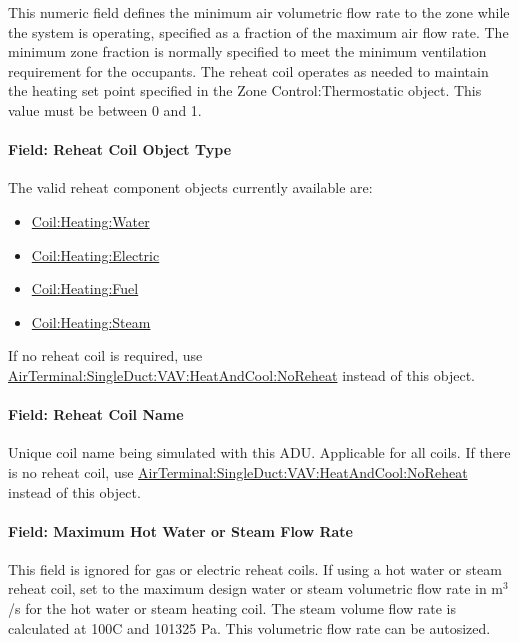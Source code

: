 This numeric field defines the minimum air volumetric flow rate to the zone while the system is operating, specified as a fraction of the maximum air flow rate. The minimum zone fraction is normally specified to meet the minimum ventilation requirement for the occupants. The reheat coil operates as needed to maintain the heating set point specified in the Zone Control:Thermostatic object. This value must be between 0 and 1.

\paragraph{Field: Reheat Coil Object Type}\label{field-reheat-coil-object-type-2}

The valid reheat component objects currently available are:

\begin{itemize}
\item
  \hyperref[coilheatingwater]{Coil:Heating:Water}
\item
  \hyperref[coilheatingelectric]{Coil:Heating:Electric}
\item
  \hyperref[coilheatinggas-000]{Coil:Heating:Fuel}
\item
  \hyperref[coilheatingsteam]{Coil:Heating:Steam}
\end{itemize}

If no reheat coil is required, use \hyperref[airterminalsingleductvavheatandcoolnoreheat]{AirTerminal:SingleDuct:VAV:HeatAndCool:NoReheat} instead of this object.

\paragraph{Field: Reheat Coil Name}\label{field-reheat-coil-name-2}

Unique coil name being simulated with this ADU. Applicable for all coils. If there is no reheat coil, use \hyperref[airterminalsingleductvavheatandcoolnoreheat]{AirTerminal:SingleDuct:VAV:HeatAndCool:NoReheat} instead of this object.

\paragraph{Field: Maximum Hot Water or Steam Flow Rate}\label{field-maximum-hot-water-or-steam-flow-rate-3}

This field is ignored for gas or electric reheat coils. If using a hot water or steam reheat coil, set to the maximum design water or steam volumetric flow rate in m\(^{3}\)/s for the hot water or steam heating coil. The steam volume flow rate is calculated at 100C and 101325 Pa. This volumetric flow rate can be autosized.

